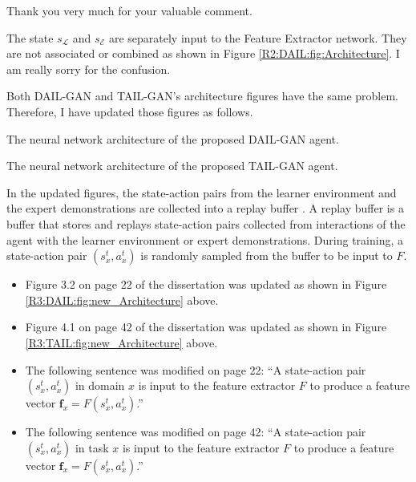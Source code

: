 \begin{revresponse}
  Thank you very much for your valuable comment.


  The state $s_\mathcal{L}$ and $s_\mathcal{E}$ are separately input to the Feature Extractor network.
  They are not associated or combined as shown in Figure \ref{R2:DAIL:fig:Architecture}.
  I am really sorry for the confusion.

  Both DAIL-GAN and TAIL-GAN's architecture figures have the same problem.
  Therefore, I have updated those figures as follows.

  {The neural network architecture of the proposed DAIL-GAN agent.\label{R3:DAIL:fig:new_Architecture}}

  {The neural network architecture of the proposed TAIL-GAN agent.\label{R3:TAIL:fig:new_Architecture}}

  In the updated figures,
  the state-action pairs from the learner environment and the expert demonstrations are collected into a replay buffer \cite{zhang2017deeper}.
  A replay buffer is a buffer that stores and replays state-action pairs collected from interactions of the agent with the learner environment or expert demonstrations.
  During training,
  a state-action pair $(s^t_x, a^t_x)$ is randomly sampled from the buffer to be input to $F$.


  \begin{correction}
    \begin{itemize}
      \item Figure 3.2 on page 22 of the dissertation was updated as shown in Figure \ref{R3:DAIL:fig:new_Architecture} above.
      \item Figure 4.1 on page 42 of the dissertation was updated as shown in Figure \ref{R3:TAIL:fig:new_Architecture} above.
      \item The following sentence was modified on page 22: \enquote{A state-action pair $(s^t_x, a^t_x)$ in domain $x$ is  input to the feature extractor $F$ to produce a feature vector $\mathbf{f}_x=F(s^t_x, a^t_x)$.}
      \item The following sentence was modified on page 42: \enquote{A state-action pair $(s^t_x, a^t_x)$ in task $x$ is  input to the feature extractor $F$ to produce a feature vector $\mathbf{f}_x=F(s^t_x, a^t_x)$.}
    \end{itemize}
  \end{correction}
\end{revresponse}

